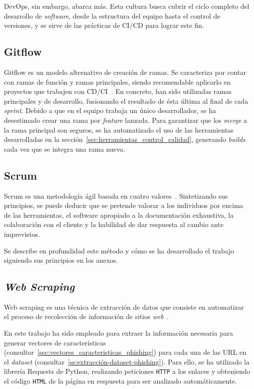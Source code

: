 DevOps, sin embargo, abarca más. Esta cultura busca cubrir el ciclo completo del desarrollo de \textit{software}, desde la estructura del equipo hasta el control de versiones, y se sirve de las prácticas de CI/CD para lograr este fin.

\subsection{Gitflow}

Gitflow es un modelo alternativo de creación de ramas. Se caracteriza por contar con ramas de función y ramas principales, siendo recomendable aplicarlo en proyectos que trabajen con CD/CI~\cite{gitFlow}. En concreto, han sido utilizadas ramas principales y de desarrollo, fusionando el resultado de ésta última al final de cada \textit{sprint}. Debido a que en el equipo trabaja un único desarrollador, se ha desestimado crear una rama por \textit{feature} lanzada. Para garantizar que los \textit{merge} a la rama principal son seguros, se ha automatizado el uso de las herramientas desarrolladas en la sección~\ref{sec:herramientas_control_calidad}, generando \textit{builds} cada vez que se integra una rama nueva.

\subsection{Scrum}

Scrum es una metodología ágil basada en cuatro valores~\cite{scrumMaster2022}. Sintetizando sus principios, se puede deducir que se pretende valorar a los individuos por encima de las herramientas, el software apropiado a la documentación exhaustiva, la colaboración con el cliente y la habilidad de dar respuesta al cambio ante imprevistos.

Se describe en profundidad este método y cómo se ha desarrollado el trabajo siguiendo sus principios en los anexos.

\subsection{\textit{Web Scraping}}

Web scraping es una técnica de extracción de datos que consiste en automatizar el proceso de recolección de información de sitios \textit{web}~\cite{webScraping}.

En este trabajo ha sido empleado para extraer la información necesaria para generar vectores de características (consultar~\ref{sec:vectores_caracteristicas_phishing}) para cada una de las URL en el \textit{dataset} (consultar~\ref{ss:extracción-dataset-phishing}). Para ello, se ha utilizado la librería Requests de Python, realizando peticiones \texttt{HTTP} a los enlaces y obteniendo el código \texttt{HTML} de la página en respuesta para ser analizado automáticamente.

